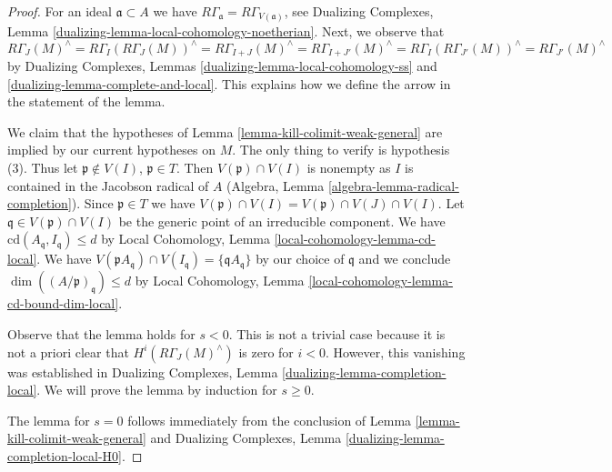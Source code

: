 \documentclass[10pt,a4paper]{amsart}
\theoremstyle{plain}
\theoremstyle{definition}
\theoremstyle{remark}
\numberwithin{equation}{subsection}
\begin{document}
\begin{proof}
For an ideal $\mathfrak a \subset A$ we have
$R\Gamma_\mathfrak a = R\Gamma_{V(\mathfrak a)}$, see
Dualizing Complexes, Lemma \ref{dualizing-lemma-local-cohomology-noetherian}.
Next, we observe that
$$
R\Gamma_J(M)^\wedge =
R\Gamma_I(R\Gamma_J(M))^\wedge =
R\Gamma_{I + J}(M)^\wedge =
R\Gamma_{I + J'}(M)^\wedge =
R\Gamma_I(R\Gamma_{J'}(M))^\wedge =
R\Gamma_{J'}(M)^\wedge
$$
by Dualizing Complexes, Lemmas \ref{dualizing-lemma-local-cohomology-ss} and
\ref{dualizing-lemma-complete-and-local}.
This explains how we define the arrow in the statement of the lemma.

\medskip\noindent
We claim that the hypotheses of Lemma \ref{lemma-kill-colimit-weak-general}
are implied by our current hypotheses on $M$.
The only thing to verify is hypothesis (3).
Thus let $\mathfrak p \not \in V(I)$, $\mathfrak p \in T$.
Then $V(\mathfrak p) \cap V(I)$ is nonempty as $I$ is
contained in the Jacobson radical of $A$
(Algebra, Lemma \ref{algebra-lemma-radical-completion}).
Since $\mathfrak p \in T$ we have
$V(\mathfrak p) \cap V(I) = V(\mathfrak p) \cap V(J) \cap V(I)$.
Let $\mathfrak q \in V(\mathfrak p) \cap V(I)$ be the
generic point of an irreducible component.
We have $\text{cd}(A_\mathfrak q, I_\mathfrak q) \leq d$
by Local Cohomology, Lemma \ref{local-cohomology-lemma-cd-local}.
We have $V(\mathfrak pA_\mathfrak q) \cap V(I_\mathfrak q) =
\{\mathfrak qA_\mathfrak q\}$ by our choice of $\mathfrak q$
and we conclude $\dim((A/\mathfrak p)_\mathfrak q) \leq d$
by Local Cohomology, Lemma \ref{local-cohomology-lemma-cd-bound-dim-local}.

\medskip\noindent
Observe that the lemma holds for $s < 0$. This is not a trivial case because
it is not a priori clear that $H^i(R\Gamma_J(M)^\wedge)$
is zero for $i < 0$. However, this vanishing was established in
Dualizing Complexes, Lemma \ref{dualizing-lemma-completion-local}.
We will prove the lemma by induction for $s \geq 0$.

\medskip\noindent
The lemma for $s = 0$ follows immediately from
the conclusion of Lemma \ref{lemma-kill-colimit-weak-general}
and Dualizing Complexes, Lemma \ref{dualizing-lemma-completion-local-H0}.


\end{proof}
\end{document}
